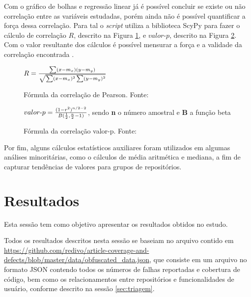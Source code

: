 \documentclass[11.5pt]{article}
\begin{document}
Com o gráfico de bolhas e regressão linear já é possível concluir se existe ou não correlação entre
as variáveis estudadas, porém ainda não é possível quantificar a força dessa correlação.
Para tal o \textit{script} utiliza a biblioteca ScyPy
\cite{scipy} para fazer o cálculo de correlação $R$, descrito na Figura \ref{fig:formulaCorrelacao},
e $valor\mbox{-}p$, descrito na Figura \ref{fig:formulaValorP}.
Com o valor resultante dos cálculos é possível mensurar a força e a validade da correlação encontrada
\cite{openIntroStat}.

\begin{figure}[ht]
\caption{Fórmula da correlação de Pearson. Fonte: \cite{scipy}}
\label{fig:formulaCorrelacao}
\begin{center}
    $R = {\sum(x - m_x)(y - m_y) \over \sqrt{\sum(x - m_x)^2 \sum(y - m_y)^2}}$
\end{center}
\end{figure}

\begin{figure}[ht]
\caption{Fórmula da correlação valor-p. Fonte: \cite{scipy}}
\label{fig:formulaValorP}
\begin{center}
    $valor\mbox{-}p = { (1 - r^2)^{n/2-2} \over B({1 \over 2}, {n \over 2} - 1) }$,
    sendo \textbf{n} o número amostral e \textbf{B} a função beta
\end{center}
\end{figure}

Por fim, alguns cálculos estatísticos auxiliares foram utilizados em algumas análises minoritárias,
como o cálculos de média aritmética e mediana, a fim de capturar
tendências de valores para grupos de repositórios.




\section{Resultados} \label{sec:resultados}

Esta sessão tem como objetivo apresentar os resultados obtidos no estudo.

Todos os resultados descritos nesta sessão se baseiam no arquivo contido em
\url{https://github.com/redivo/article-coverage-and-defects/blob/master/data/obfuscated_data.json},
que consiste em um arquivo no formato JSON contendo todos os números de
falhas reportadas e cobertura de código, bem como os relacionamentos entre repositórios e
funcionalidades de usuário, conforme descrito na sessão \ref{sec:triagem}.
\end{document}
